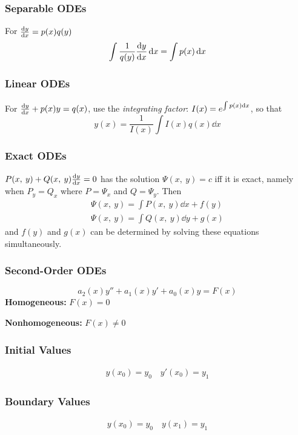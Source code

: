 \documentclass{article}
\begin{document}
\begin{multicols}{3}
    \subsubsection*{Separable ODEs}
    For $\dv{y}{x} = p(x) q(y)$
    \begin{equation*}
        \int \frac{1}{q(y)} \dv{y}{x} \dd{x} = \int p(x) \dd{x}
    \end{equation*}
    \subsubsection*{Linear ODEs}
    For $\dv{y}{x} + p(x)y = q(x)$, use the \textit{integrating factor}:
    $I(x) = e^{\int p(x) \dd{x}}$, so that
    \begin{equation*}
        y(x) = \frac{1}{I(x)} \int I(x) q(x) \dd{x}
    \end{equation*}
    \subsubsection*{Exact ODEs}
    $P(x,\: y) + Q(x,\: y)\dv{y}{x} = 0$
    has the solution
    $\Psi(x,\: y) = c$
    iff it is exact, namely when
    $P_y = Q_x$
    where $P = \Psi_x$ and $Q = \Psi_y$. Then
    \begin{gather*}
        \Psi(x,\: y) = \int P(x,\: y) \dd{x} + f(y) \\
        \Psi(x,\: y) = \int Q(x,\: y) \dd{y} + g(x)
    \end{gather*}
    and $f(y)$ and $g(x)$ can be determined by solving these equations simultaneously.
    \subsubsection*{Second-Order ODEs}
    \begin{equation*}
        a_2(x)y'' + a_1(x)y' + a_0(x)y = F(x)
    \end{equation*}
    \textbf{Homogeneous:} $F(x) = 0$

    \textbf{Nonhomogeneous:} $F(x) \neq 0$
    \subsubsection*{Initial Values}
    \begin{align*}
        y(x_0) = y_0 \quad y'(x_0) = y_1
    \end{align*}
    \subsubsection*{Boundary Values}
    \begin{align*}
        y(x_0) = y_0 \quad y(x_1) = y_1
    \end{align*}

\end{multicols}
\end{document}
